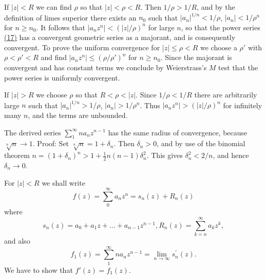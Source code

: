 If $|z| < R$ we can find $\rho$ so that $|z| < \rho < R$. Then $1/\rho > 1/R$, and by the definition of limes superior there exists an $n_0$ such that $|a_n|^{1/n} < 1/\rho$, $|a_n| < 1/\rho^n$ for $n \geq n_0$. It follows that $|a_n z^n| < (|z|/\rho)^n$ for large $n$, so that the power series \hyperref[eq:2.17]{(17)} has a convergent geometric series as a majorant, and is consequently convergent. To prove the uniform convergence for $|z| \leq \rho < R$ we choose a $\rho'$ with $\rho < \rho' < R$ and find $|a_n z^n| \leq (\rho / \rho')^n$ for $n \geq n_0$. Since the majorant is convergent and has constant terms we conclude by Weierstrass's $M$ test that the power series is uniformly convergent.

If $|z| > R$ we choose $\rho$ so that $R < \rho < |z|$. Since $1 / \rho < 1 / R$ there are arbitrarily large $n$ such that $|a_n|^{1 / n} > 1 / \rho$, $|a_n| > 1 / \rho^n$. Thus $|a_n z^n| > (|z| / \rho)^n$ for infinitely many $n$, and the terms are unbounded.

The derived series $\sum_{1}^{\infty} na_n z^{n-1}$ has the same radius of convergence, because $\sqrt[n]{n} \to 1$. Proof: Set $\sqrt[n]{n} = 1 + \delta_n$. Then $\delta_n > 0$, and by use of the binomial theorem $n = (1 + \delta_n)^n > 1 + \frac{1}{2} n(n - 1)\delta_n^2$. This gives $\delta_n^2 < 2/n$, and hence $\delta_n \to 0$.

For $|z| < R$ we shall write
\begin{equation*}
f (z) = \sum_ {0} ^ {\infty} a _ {n} z ^ {n} = s _ {n} (z) + R _ {n} (z)
\end{equation*}
where
\begin{equation*}
s _ {n} (z) = a _ {0} + a _ {1} z + \dots + a _ {n - 1} z ^ {n - 1}, R _ {n} (z) = \sum_ {k = n} ^ {\infty} a _ {k} z ^ {k},
\end{equation*}
and also
\begin{equation*}
f _ {1} (z) = \sum_ {1} ^ {\infty} n a _ {n} z ^ {n - 1} = \lim _ {n \rightarrow \infty} s _ {n} ^ {\prime} (z).
\end{equation*}
We have to show that $f'(z) = f_1(z)$.

